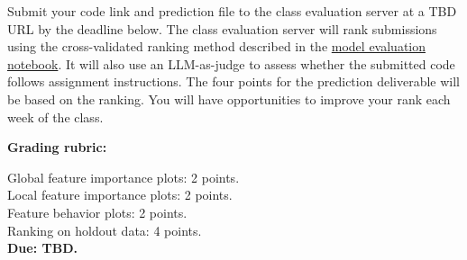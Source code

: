 \documentclass[fleqn]{article}
\begin{document}
Submit your code link and prediction file to the class evaluation server at a TBD URL by the deadline below. The class evaluation server will rank submissions using the cross-validated ranking method described in the \href{https://github.com/jphall663/GWU_rml/blob/master/assignment/eval.ipynb}{model evaluation notebook}. It will also use an LLM-as-judge to assess whether the submitted code follows assignment instructions. The four points for the prediction deliverable will be based on the ranking. You will have opportunities to improve your rank each week of the class.

\par\vspace{0.6\baselineskip}
\noindent\textbf{Grading rubric:}\par\vspace{0.3\baselineskip}

\noindent Global feature importance plots: 2 points.\\
\noindent Local feature importance plots: 2 points.\\
\noindent Feature behavior plots: 2 points.\\
\noindent Ranking on holdout data: 4 points.\\

\noindent \textbf{Due: TBD.}\\
\end{document}
